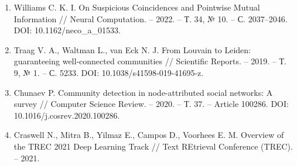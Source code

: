 \documentclass[14pt, a4paper]{article}
\begin{document}
\begin{enumerate}[wide=0pt, leftmargin=0pt, labelindent=\parindent, listparindent=\parindent, nosep, label=\arabic*]
		\item \hypertarget{src:i10}{} Williams C. K. I. On Suspicious Coincidences and Pointwise Mutual Information // Neural Computation. -- 2022. -- Т. 34, № 10. -- С. 2037--2046. DOI: 10.1162/neco\_a\_01533.
		\item \hypertarget{src:i11}{} Traag V. A., Waltman L., van Eck N. J. From Louvain to Leiden: guaranteeing well-connected communities // Scientific Reports. -- 2019. -- Т. 9, № 1. -- С. 5233. DOI: 10.1038/s41598-019-41695-z.
		\item \hypertarget{src:i12}{} Chunaev P. Community detection in node-attributed social networks: A survey // Computer Science Review. -- 2020. -- Т. 37. -- Article 100286. DOI: 10.1016/j.cosrev.2020.100286.
		\item \hypertarget{src:i13}{} Craswell N., Mitra B., Yilmaz E., Campos D., Voorhees E. M. Overview of the TREC 2021 Deep Learning Track // Text REtrieval Conference (TREC). -- 2021.
	\end{enumerate}

	
\end{document}
